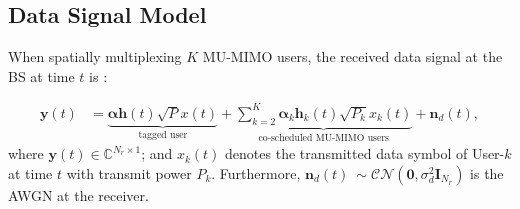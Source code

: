 \documentclass[conference, a4paper, 10pt]{IEEEtran}
\newcommand{\mx}[1]{\mathbf{#1}}
\begin{document}
\begin{comment}
\begin{align}
\label{eq:LS}
\hat{\mx{h}}(t) &= \mx{h}(t) + \boldsymbol{\varepsilon}(t), \\
\boldsymbol{\varepsilon}(t) & \sim
\mathcal{CN}\left(0,\mx{\Sigma}\right)
\text{~with~} \mx{\Sigma} = \frac{\boldsymbol{\Lambda}_p}{\alpha^2 F P_p}
\end{align}
where $\mathcal{CN}\left(0,\mx{\Sigma}\right)$ is the $N_r$ dimensional complex normal distribution with mean $0$ and covariance matrix $\mx{\Sigma}$,  $\boldsymbol{\Lambda}_p$ is the covariance matrix of the \ac{AWGN} on the pilot symbols at the receiver
and $\alpha$ is the path loss between the \ac{MS} and the \ac{BS} \cite{Fodor:21}, which are assumed to be identical for all $F$ frequencies.
\end{comment}


\subsection{Data Signal Model}
When spatially multiplexing $K$ \ac{MU-MIMO} users,
the received data signal at the \ac{BS} at time $t$ is \cite{Fodor:21}:

\begin{align}
\mathbf{y}(t)
&=
\underbrace{\mathbf{\alpha} \mathbf{h}(t) \sqrt{P} x(t)}_{\text{tagged user}}
+ \underbrace{\sum_{k=2}^K \mathbf{\alpha}_{k} \mathbf{h}_k(t) \sqrt{P_{k}} x_{k}(t)}_{\text{co-scheduled MU-MIMO users}}
+\mathbf{n}_d(t),
\label{eq:mumimo2}
\end{align}
\noindent where $\mathbf{y}(t)\in \mathds{C}^{N_r \times 1}$;
and $x_k(t)$ denotes the transmitted data symbol of User-$k$
at time $t$ with transmit power $P_k$.
Furthermore, $\mathbf{n}_d(t)~\sim \mathcal{CN}\left(\mx{0},\sigma_d^2 \mathbf{I}_{N_r}\right)$
is the \ac{AWGN} at the receiver.
\vspace{-2mm}
\end{document}
